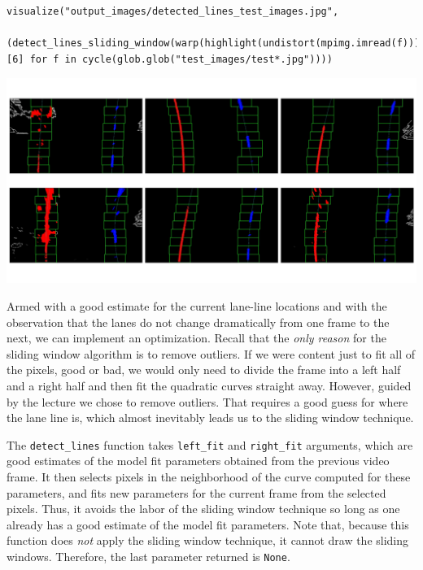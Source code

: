 \documentclass[11pt]{article}
\begin{document}
\begin{verbatim}
visualize("output_images/detected_lines_test_images.jpg",
	  (detect_lines_sliding_window(warp(highlight(undistort(mpimg.imread(f)))))[6] for f in cycle(glob.glob("test_images/test*.jpg"))))
\end{verbatim}

\includegraphics[width=.9\linewidth]{output_images/detected_lines_test_images.jpg}

Armed with a good estimate for the current lane-line locations
and with the observation that the lanes do not change
dramatically from one frame to the next, we can implement an
optimization.  Recall that the \emph{only reason} for the sliding
window algorithm is to remove outliers.  If we were content just
to fit all of the pixels, good or bad, we would only need to
divide the frame into a left half and a right half and then fit
the quadratic curves straight away.  However, guided by the
lecture we chose to remove outliers.  That requires a good guess
for where the lane line is, which almost inevitably leads us to
the sliding window technique.

The \texttt{detect\_lines} function takes \texttt{left\_fit} and \texttt{right\_fit}
arguments, which are good estimates of the model fit parameters
obtained from the previous video frame.  It then selects pixels
in the neighborhood of the curve computed for these parameters,
and fits new parameters for the current frame from the selected
pixels.  Thus, it avoids the labor of the sliding window
technique so long as one already has a good estimate of the
model fit parameters.  Note that, because this function does
\emph{not} apply the sliding window technique, it cannot draw the
sliding windows.  Therefore, the last parameter returned is
\texttt{None}.  
\end{document}
